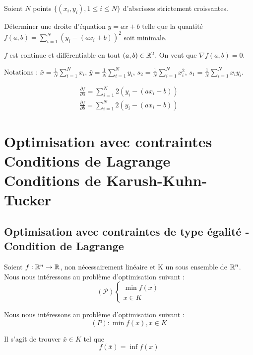 		\begin{exemple}%
		
		Soient $N$ points $\{(x_i, y_i), 1\leq i \leq N\}$ d'abscisses strictement croissantes.
		
		Déterminer une droite d'équation $y=ax+b$ telle que la quantité $\displaystyle f(a, b) = \sum_{i=1}^N (y_i-(ax_i+b))^2$ soit minimale.
		
		$f$ est continue et différentiable en tout $(a, b) \in \mathbb{R}^2$.
		On veut que $\nabla f(a, b) = 0$.
		
		Notations :
		$\displaystyle \bar{x} = \frac{1}{N} \sum_{i=1}^N x_i$, 
		$\displaystyle \bar{y} = \frac{1}{N} \sum_{i=1}^N y_i$, 
		$\displaystyle s_2 = \frac{1}{N} \sum_{i=1}^N x_i^2$, 
		$\displaystyle s_1 = \frac{1}{N} \sum_{i=1}^N x_i y_i$.
		
		\begin{eqnarray*}%
 \frac{\partial f}{\partial a} = \sum_{i=1}^N 2(y_i-(ax_i+b)) \\ \frac{\partial f}{\partial b} = \sum_{i=1}^N 2(y_i-(ax_i+b)) \end{eqnarray*}

		\end{exemple}
		
		
\section{Optimisation avec contraintes \\ Conditions de Lagrange \\ Conditions de Karush-Kuhn-Tucker }

\subsection{Optimisation avec contraintes de type égalité - Condition de Lagrange}
Soient $f : \mathbb{R}^n \rightarrow \mathbb{R}$, non nécessairement linéaire et K un sous ensemble de $\mathbb{R}^n$.\\
Nous nous intéressons au problème d'optimisation suivant :
 \[ (\mathcal{P})\begin{cases}\min f(x) \\ x \in K \end{cases} \]


Nous nous intéressons au problème d'optimisation suivant : \[ (P) : \min f(x), x \in K \]

Il s'agit de trouver $\bar{x} \in K$ tel que \[ f(\bar{x}) = \inf f(x) \]

